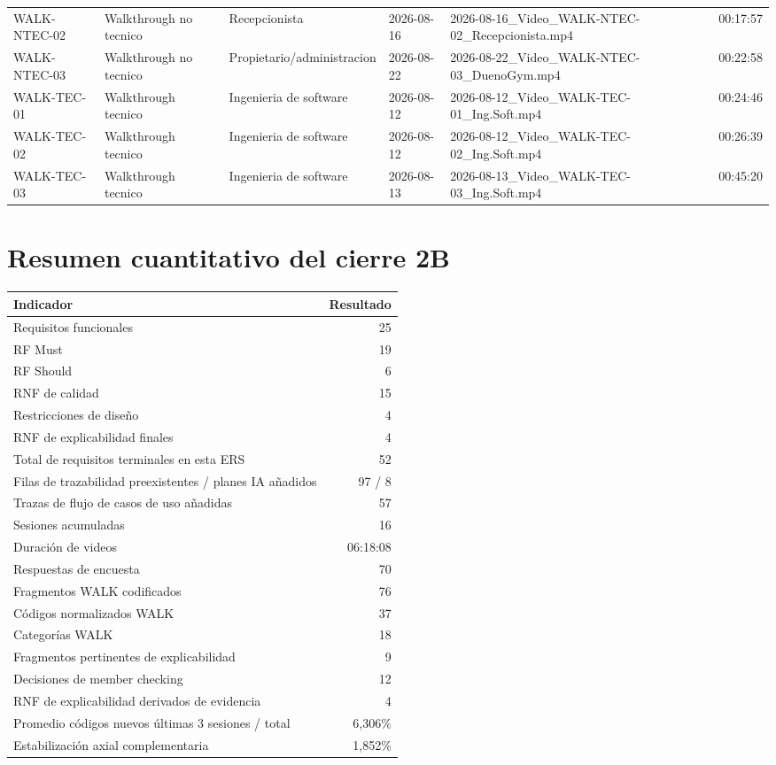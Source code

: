\documentclass[11pt,a4paper,twoside]{article}
\begin{document}
\begin{landscape}
\begin{longtable}{p{2.2cm}p{3.2cm}p{4.2cm}p{2.7cm}p{7.8cm}p{2.2cm}}
WALK-NTEC-02 & Walkthrough no tecnico & Recepcionista & 2026-08-16 & 2026-08-16\_Video\_WALK-NTEC-02\_Recepcionista.mp4 & 00:17:57 \\
WALK-NTEC-03 & Walkthrough no tecnico & Propietario/administracion & 2026-08-22 & 2026-08-22\_Video\_WALK-NTEC-03\_DuenoGym.mp4 & 00:22:58 \\
WALK-TEC-01 & Walkthrough tecnico & Ingenieria de software & 2026-08-12 & 2026-08-12\_Video\_WALK-TEC-01\_Ing.Soft.mp4 & 00:24:46 \\
WALK-TEC-02 & Walkthrough tecnico & Ingenieria de software & 2026-08-12 & 2026-08-12\_Video\_WALK-TEC-02\_Ing.Soft.mp4 & 00:26:39 \\
WALK-TEC-03 & Walkthrough tecnico & Ingenieria de software & 2026-08-13 & 2026-08-13\_Video\_WALK-TEC-03\_Ing.Soft.mp4 & 00:45:20 \\
\bottomrule\end{longtable}\normalsize
\end{landscape}

\section{Resumen cuantitativo del cierre 2B}
\begin{tabularx}{\textwidth}{Xr}\toprule
Indicador & Resultado \\ \midrule
Requisitos funcionales & 25 \\
RF Must & 19 \\
RF Should & 6 \\
RNF de calidad & 15 \\
Restricciones de diseño & 4 \\
RNF de explicabilidad finales & 4 \\
Total de requisitos terminales en esta ERS & 52 \\
Filas de trazabilidad preexistentes / planes IA añadidos & 97 / 8 \\
Trazas de flujo de casos de uso añadidas & 57 \\
Sesiones acumuladas & 16 \\
Duración de videos & 06:18:08 \\
Respuestas de encuesta & 70 \\
Fragmentos WALK codificados & 76 \\
Códigos normalizados WALK & 37 \\
Categorías WALK & 18 \\
Fragmentos pertinentes de explicabilidad & 9 \\
Decisiones de member checking & 12 \\
RNF de explicabilidad derivados de evidencia & 4 \\
Promedio códigos nuevos últimas 3 sesiones / total & 6,306\% \\
Estabilización axial complementaria & 1,852\% \\
\bottomrule\end{tabularx}
\end{document}

